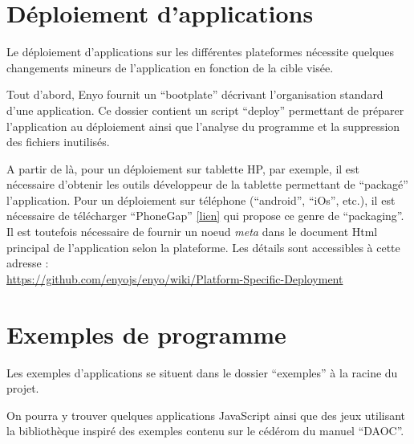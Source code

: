 \documentclass[11pt,a4paper]{report}
\begin{document}


\section{Déploiement d'applications}

Le déploiement d'applications sur les différentes plateformes nécessite quelques changements mineurs 
de l'application en fonction de la cible visée.

Tout d'abord, Enyo fournit un ``bootplate'' décrivant l'organisation standard d'une application.
Ce dossier contient un script ``deploy'' permettant de préparer l'application au 
déploiement ainsi que l'analyse du programme et la suppression des fichiers inutilisés.

A partir de là, pour un déploiement sur tablette HP, par exemple, il est nécessaire d'obtenir les outils
développeur de la tablette permettant de ``packagé'' l'application.
Pour un déploiement sur téléphone (``android'', ``iOs'', etc.), il est nécessaire de télécharger
``PhoneGap'' \href{http://www.phonegap.com/developer}{[lien]} qui propose ce genre de ``packaging''.
Il est toutefois nécessaire de fournir un noeud \emph{meta} dans le document Html principal de l'application
selon la plateforme.
Les détails sont accessibles à cette adresse : \\
\url{https://github.com/enyojs/enyo/wiki/Platform-Specific-Deployment}

\section{Exemples de programme}

Les exemples d'applications se situent dans le dossier ``exemples'' à la racine du projet.

On pourra y trouver quelques applications JavaScript ainsi que des jeux utilisant la bibliothèque inspiré des exemples contenu sur le cédérom 
du manuel ``DAOC''\cite{DAOC}.

\nocite{*}


\end{document}
